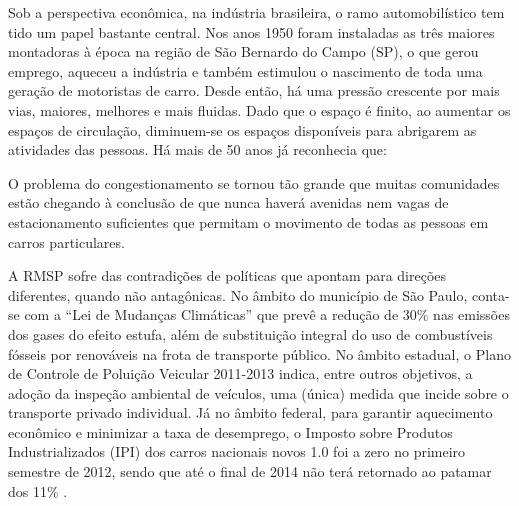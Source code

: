 Sob a perspectiva econômica, na indústria brasileira, o ramo automobilístico tem tido um papel bastante central. Nos anos 1950 foram instaladas as três maiores montadoras à época na região de São Bernardo do Campo (SP), o que gerou emprego, aqueceu a indústria e também estimulou o nascimento de toda uma geração de motoristas de carro. Desde então, há uma pressão crescente por mais vias, maiores, melhores e mais fluidas.
Dado que o espaço é finito, ao aumentar os espaços de circulação, diminuem-se os espaços disponíveis para abrigarem as atividades das pessoas. Há mais de 50 anos  já reconhecia que:

\begin{citacao}
O problema do congestionamento se tornou tão grande que muitas comunidades estão chegando à conclusão de que nunca haverá avenidas nem vagas de estacionamento suficientes que permitam o movimento de todas as pessoas em carros particulares.
\end{citacao}

A RMSP sofre das contradições de políticas que apontam para direções diferentes, quando não antagônicas. No âmbito do município de São Paulo, conta-se com a ``Lei de Mudanças Climáticas'' \cite{LEICLIMASP2009} que prevê a redução de 30\% nas emissões dos gases do efeito estufa, além de substituição integral do uso de combustíveis fósseis por renováveis na frota de transporte público. No âmbito estadual, o Plano de Controle de Poluição Veicular 2011-2013 \cite{PCPV2011} indica, entre outros objetivos, a adoção da inspeção ambiental de veículos, uma (única) medida que incide sobre o transporte privado individual. Já no âmbito federal, para garantir aquecimento econômico e minimizar a taxa de desemprego, o Imposto sobre Produtos Industrializados (IPI) dos carros nacionais novos 1.0 foi a zero no primeiro semestre de 2012, sendo que até o final de 2014 não terá retornado ao patamar dos 11\% \cite{FAZENDA2014}.

